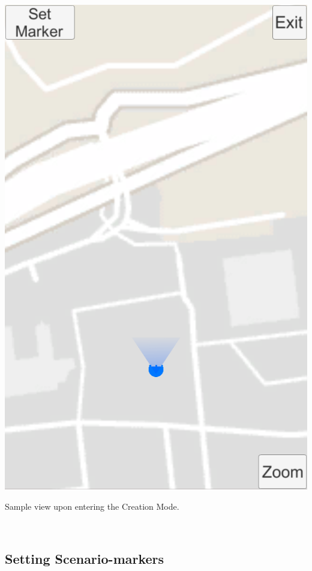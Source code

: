 \documentclass{sigchi-ext}
\begin{document}
\begin{marginfigure}[1pc]
	\begin{minipage}{\marginparwidth}
		\centering
		\includegraphics[width=0.9\marginparwidth]{figures/CM_Entering}
		\caption{Sample view upon entering the Creation Mode.}~\label{fig:CM_Entering}
	\end{minipage}
\end{marginfigure}
 

\subsection{Setting Scenario-markers}
\end{document}
